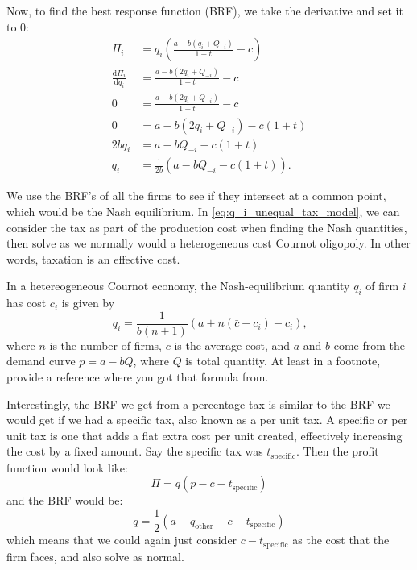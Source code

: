 \documentclass[11pt]{article}
\newcommand{\red}[1]{\textcolor{WildStrawberry}{#1}} %
\begin{document}
Now, to find the best response function (BRF), we take the derivative and
set it to 0:
\begin{subequations}
\begin{align}
    \Pi_i &= q_i \left(\frac{a - b(q_i + Q_{-i})}{1+t} - c\right)\\
    \frac{\mathrm{d}\Pi_i}{\mathrm{d}q_i} &= \frac{a - b(2q_i + Q_{-i})}{1+t} -
    c\\
    0 &= \frac{a - b(2q_i + Q_{-i})}{1+t} - c\\
    0 &= a - b(2q_i + Q_{-i}) - c\left(1+t\right)\\
    2bq_i &= a - bQ_{-i} - c\left(1+t\right)\\
    q_i &= \frac{1}{2b}\left(a-bQ_{-i} - c\left(1+t\right)\right). \label{eq:q_i_unequal_tax_model}
\end{align}
\end{subequations}

We use the BRF's of all the firms to see if they intersect at a common point,
which would be the Nash equilibrium.  In \eqref{eq:q_i_unequal_tax_model},
we can consider the tax as part of the production cost when finding the Nash
quantities, then solve as we normally would a heterogeneous cost Cournot
oligopoly. In other words, taxation is an effective cost.

In a hetereogeneous Cournot economy, the Nash-equilibrium quantity $q_i$
of firm $i$ has cost $c_i$ is given by
\begin{equation}
q_i = \frac{1}{b (n+1)}(a + n(\bar c - c_i) - c_i)\text{,}
\end{equation}
where $n$ is the number of firms, $\bar c$ is the average cost, and $a$ and $b$
come from the demand curve $p = a-bQ$, where $Q$ is total quantity. \red{At
least in a footnote, provide a reference where you got that formula from.}

Interestingly, the BRF we get from a percentage tax is similar to the BRF we
would get if we had a specific tax, also known as a per unit tax.  A specific
or per unit tax is one that adds a flat extra cost per unit created,
effectively increasing the cost by a fixed amount. Say the specific tax was
$t_\text{specific}$. Then the profit function would look like:
\begin{equation}
\Pi = q (p-c-t_\text{specific})
\end{equation}
and the BRF would be:
\begin{equation}
q = \frac{1}{2}(a-q_\text{other} - c - t_\text{specific})
\end{equation}
which means that we could again just consider $c - t_\text{specific}$ as the
cost that the firm faces, and also solve as normal.  
\end{document}
